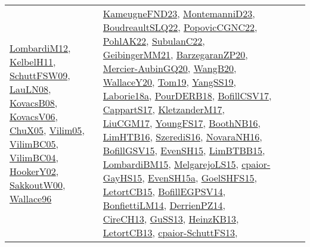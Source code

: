 {\begin{longtable}{lp{3cm}>{\raggedright}p{6cm}>{\raggedright}p{6cm}p{8cm}}
\href{articles/LombardiM12.pdf}{LombardiM12}\cite{LombardiM12}, \href{articles/KelbelH11.pdf}{KelbelH11}\cite{KelbelH11}, \href{papers/SchuttFSW09.pdf}{SchuttFSW09}\cite{SchuttFSW09}, \href{papers/LauLN08.pdf}{LauLN08}\cite{LauLN08}, \href{articles/KovacsB08.pdf}{KovacsB08}\cite{KovacsB08}, \href{papers/KovacsV06.pdf}{KovacsV06}\cite{KovacsV06}, \href{papers/ChuX05.pdf}{ChuX05}\cite{ChuX05}, \href{papers/Vilim05.pdf}{Vilim05}\cite{Vilim05}, \href{articles/VilimBC05.pdf}{VilimBC05}\cite{VilimBC05}, \href{papers/VilimBC04.pdf}{VilimBC04}\cite{VilimBC04}, \href{papers/HookerY02.pdf}{HookerY02}\cite{HookerY02}, \href{articles/SakkoutW00.pdf}{SakkoutW00}\cite{SakkoutW00}, \href{articles/Wallace96.pdf}{Wallace96}\cite{Wallace96} & \href{papers/KameugneFND23.pdf}{KameugneFND23}\cite{KameugneFND23}, \href{articles/MontemanniD23.pdf}{MontemanniD23}\cite{MontemanniD23}, \href{papers/BoudreaultSLQ22.pdf}{BoudreaultSLQ22}\cite{BoudreaultSLQ22}, \href{papers/PopovicCGNC22.pdf}{PopovicCGNC22}\cite{PopovicCGNC22}, \href{articles/PohlAK22.pdf}{PohlAK22}\cite{PohlAK22}, \href{articles/SubulanC22.pdf}{SubulanC22}\cite{SubulanC22}, \href{papers/GeibingerMM21.pdf}{GeibingerMM21}\cite{GeibingerMM21}, \href{papers/BarzegaranZP20.pdf}{BarzegaranZP20}\cite{BarzegaranZP20}, \href{papers/Mercier-AubinGQ20.pdf}{Mercier-AubinGQ20}\cite{Mercier-AubinGQ20}, \href{papers/WangB20.pdf}{WangB20}\cite{WangB20}, \href{articles/WallaceY20.pdf}{WallaceY20}\cite{WallaceY20}, \href{papers/Tom19.pdf}{Tom19}\cite{Tom19}, \href{papers/YangSS19.pdf}{YangSS19}\cite{YangSS19}, \href{papers/Laborie18a.pdf}{Laborie18a}\cite{Laborie18a}, \href{articles/PourDERB18.pdf}{PourDERB18}\cite{PourDERB18}, \href{papers/BofillCSV17.pdf}{BofillCSV17}\cite{BofillCSV17}, \href{papers/CappartS17.pdf}{CappartS17}\cite{CappartS17}, \href{papers/KletzanderM17.pdf}{KletzanderM17}\cite{KletzanderM17}, \href{papers/LiuCGM17.pdf}{LiuCGM17}\cite{LiuCGM17}, \href{papers/YoungFS17.pdf}{YoungFS17}\cite{YoungFS17}, \href{papers/BoothNB16.pdf}{BoothNB16}\cite{BoothNB16}, \href{papers/LimHTB16.pdf}{LimHTB16}\cite{LimHTB16}, \href{papers/SzerediS16.pdf}{SzerediS16}\cite{SzerediS16}, \href{articles/NovaraNH16.pdf}{NovaraNH16}\cite{NovaraNH16}, \href{papers/BofillGSV15.pdf}{BofillGSV15}\cite{BofillGSV15}, \href{papers/EvenSH15.pdf}{EvenSH15}\cite{EvenSH15}, \href{papers/LimBTBB15.pdf}{LimBTBB15}\cite{LimBTBB15}, \href{papers/LombardiBM15.pdf}{LombardiBM15}\cite{LombardiBM15}, \href{papers/MelgarejoLS15.pdf}{MelgarejoLS15}\cite{MelgarejoLS15}, \href{papers/cpaior-GayHS15.pdf}{cpaior-GayHS15}\cite{cpaior-GayHS15}, \href{articles/EvenSH15a.pdf}{EvenSH15a}\cite{EvenSH15a}, \href{articles/GoelSHFS15.pdf}{GoelSHFS15}\cite{GoelSHFS15}, \href{articles/LetortCB15.pdf}{LetortCB15}\cite{LetortCB15}, \href{papers/BofillEGPSV14.pdf}{BofillEGPSV14}\cite{BofillEGPSV14}, \href{papers/BonfiettiLM14.pdf}{BonfiettiLM14}\cite{BonfiettiLM14}, \href{papers/DerrienPZ14.pdf}{DerrienPZ14}\cite{DerrienPZ14}, \href{papers/CireCH13.pdf}{CireCH13}\cite{CireCH13}, \href{papers/GuSS13.pdf}{GuSS13}\cite{GuSS13}, \href{papers/HeinzKB13.pdf}{HeinzKB13}\cite{HeinzKB13}, \href{papers/LetortCB13.pdf}{LetortCB13}\cite{LetortCB13}, \href{papers/cpaior-SchuttFS13.pdf}{cpaior-SchuttFS13}\cite{cpaior-SchuttFS13}, 
\end{longtable}}
